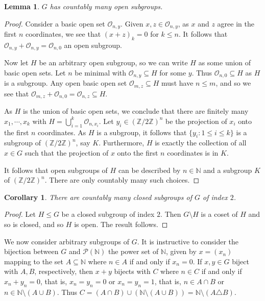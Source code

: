 \documentclass[twoside,a4paper,12pt]{article}
\theoremstyle{plain}
\newtheorem{corollary}[proposition]{Corollary}
\newtheorem{lemma}[proposition]{Lemma}
\theoremstyle{definition}
\newcommand{\mc}{\mathcal}
\begin{document}
\begin{lemma}\label{lem:1}
$G$ has countably many open subgroups.
\end{lemma}
\begin{proof}
Consider a basic open set $\mc O_{n,y}$.  Given $x,z\in \mc O_{n,y}$, as $x$ and $z$ agree in the
first $n$ coordinates, we see that $(x+z)_k = 0$ for $k\leq n$.  It follows that $\mc O_{n,y}
+ \mc O_{n,y} = \mc O_{n,0}$ an open subgroup.

Now let $H$ be an arbitrary open subgroup, so we can write $H$ as some union of basic open sets.
Let $n$ be minimal with $\mc O_{n,y}\subseteq H$ for some $y$.  Thus $\mc O_{n,0}\subseteq H$
as $H$ is a subgroup.  Any open basic open set $\mc O_{m,z}\subseteq H$ must have $n\leq m$,
and so we see that $\mc O_{m,z} + \mc O_{n,0} = \mc O_{n,z} \subseteq H$.

As $H$ is the union of basic open sets, we conclude that there are finitely many $x_1,\cdots, x_k$
with $H = \bigcup_{i=1}^k \mc O_{n,x_i}$.  Let $y_i \in (\mathbb Z / 2\mathbb Z)^n$ be the
projection of $x_i$ onto the first $n$ coordinates.  As $H$ is a subgroup, it follows that
$\{y_i : 1\leq i \leq k\}$ is a subgroup of $(\mathbb Z / 2\mathbb Z)^n$, say $K$.  Furthermore,
$H$ is exactly the collection of all $x\in G$ such that the projection of $x$ onto the first
$n$ coordinates is in $K$.

It follows that open subgroups of $H$ can be described by $n\in\mathbb N$ and a subgroup $K$ of
$(\mathbb Z / 2\mathbb Z)^n$.  There are only countably many such choices.
\end{proof}

\begin{corollary}
There are countably many closed subgroups of $G$ of index $2$.
\end{corollary}
\begin{proof}
Let $H\leq G$ be a closed subgroup of index $2$.  Then $G\setminus H$ is a coset of $H$ and so
is closed, and so $H$ is open.  The result follows.
\end{proof}

We now consider arbitrary subgroups of $G$.  It is instructive to consider the bijection between
$G$ and $\mc P(\mathbb N)$ the power set of $\mathbb N$, given by $x=(x_n)$ mapping to the set
$A\subseteq \mathbb N$ where $n\in A$ if and only if $x_n=0$.  If $x,y\in G$ biject with $A,B$,
respectively, then $x+y$ bijects with $C$ where $n\in C$ if and only if $x_n+y_n=0$, that is,
$x_n=y_n=0$ or $x_n=y_n=1$, that is, $n\in A\cap B$ or $n\in \mathbb N \setminus (A\cup B)$.
Thus $C = (A\cap B) \cup (\mathbb N \setminus (A\cup B)) = \mathbb N \setminus (A \triangle B)$.
\end{document}
